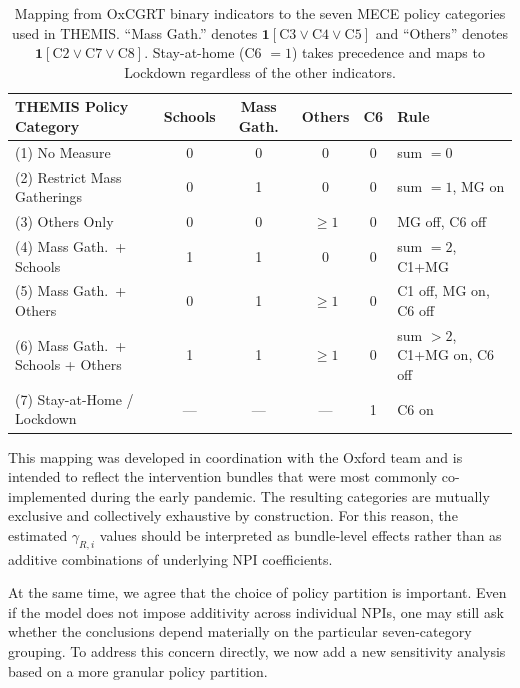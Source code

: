\documentclass[letterpaper,twoside,11pt]{reviewresponse}
\begin{document}
\begin{table}[htbp!]
	\centering
	\small
	\begin{tabular}{|l|c|c|c|c|l|}
		\hline
		\textbf{THEMIS Policy Category} & \textbf{Schools} & \textbf{Mass Gath.} & \textbf{Others} & \textbf{C6} & \textbf{Rule} \\\hline
		(1) No Measure & 0 & 0 & 0 & 0 & sum $= 0$ \\
		(2) Restrict Mass Gatherings & 0 & 1 & 0 & 0 & sum $= 1$, MG on \\
		(3) Others Only & 0 & 0 & $\geq 1$ & 0 & MG off, C6 off \\
		(4) Mass Gath.\ + Schools & 1 & 1 & 0 & 0 & sum $= 2$, C1+MG \\
		(5) Mass Gath.\ + Others & 0 & 1 & $\geq 1$ & 0 & C1 off, MG on, C6 off \\
		(6) Mass Gath.\ + Schools + Others & 1 & 1 & $\geq 1$ & 0 & sum $> 2$, C1+MG on, C6 off \\
		(7) Stay-at-Home / Lockdown & --- & --- & --- & 1 & C6 on \\\hline
	\end{tabular}
	\caption{Mapping from OxCGRT binary indicators to the seven MECE policy categories used in THEMIS. ``Mass Gath.'' denotes $\mathbf{1}[\text{C3} \lor \text{C4} \lor \text{C5}]$ and ``Others'' denotes $\mathbf{1}[\text{C2} \lor \text{C7} \lor \text{C8}]$. Stay-at-home (C6 $=1$) takes precedence and maps to Lockdown regardless of the other indicators.}
	\label{tab:oxford_mapping}
\end{table}

This mapping was developed in coordination with the Oxford team and is intended to reflect the intervention bundles that were most commonly co-implemented during the early pandemic. The resulting categories are mutually exclusive and collectively exhaustive by construction. For this reason, the estimated $\gamma_{R,i}$ values should be interpreted as bundle-level effects rather than as additive combinations of underlying NPI coefficients.

At the same time, we agree that the choice of policy partition is important. Even if the model does not impose additivity across individual NPIs, one may still ask whether the conclusions depend materially on the particular seven-category grouping. To address this concern directly, we now add a new sensitivity analysis based on a more granular policy partition.
\end{document}
